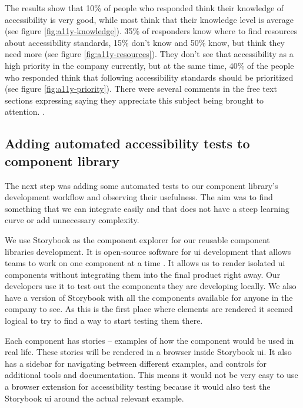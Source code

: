 \documentclass{master_thesis}
\begin{document}
The results show that 10\% of people who responded think their knowledge of accessibility is very good, while most think that their knowledge level is average (see figure \ref{fig:a11y-knowledge}). 35\% of responders know where to find resources about accessibility standards, 15\% don't know and 50\% know, but think they need more (see figure \ref{fig:a11y-resources}). They don't see that accessibility as a high priority in the company currently, but at the same time, 40\% of the people who responded think that following accessibility standards should be prioritized (see figure \ref{fig:a11y-priority}). There were several comments in the free text sections expressing saying they appreciate this subject being brought to attention.
.

\subsection{Adding automated accessibility tests to component library}
The next step was adding some automated tests to our component library's development workflow and observing their usefulness. The aim was to find something that we can integrate easily and that does not have a steep learning curve or add unnecessary complexity.

We use Storybook as the component explorer for our reusable component libraries development. It is open-source software for \ac{ui} development that allows teams to work on one component at a time \citep{storybook}. It allows us to render isolated \ac{ui} components without integrating them into the final product right away. Our developers use it to test out the components they are developing locally. We also have a version of Storybook with all the components available for anyone in the company to see. As this is the first place where elements are rendered it seemed logical to try to find a way to start testing them there.

Each component has stories – examples of how the component would be used in real life. These stories will be rendered in a browser inside Storybook \ac{ui}. It also has a sidebar for navigating between different examples, and controls for additional tools and documentation. This means it would not be very easy to use a browser extension for accessibility testing because it would also test the Storybook \ac{ui} around the actual relevant example.
\end{document}
